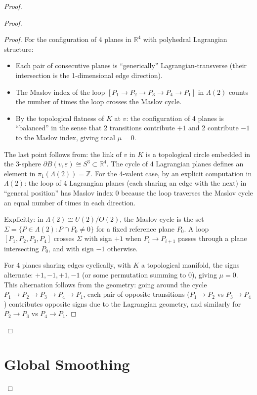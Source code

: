 \documentclass[12pt]{article}
\begin{document}
\begin{proof}
\begin{proof}
\begin{proof}
For the configuration of 4 planes in $\mathbb{R}^4$ with polyhedral Lagrangian structure:
\begin{itemize}
\item Each pair of consecutive planes is ``generically'' Lagrangian-transverse (their intersection is the 1-dimensional edge direction).
\item The Maslov index of the loop $[P_1 \to P_2 \to P_3 \to P_4 \to P_1]$ in $\Lambda(2)$ counts the number of times the loop crosses the Maslov cycle.
\item By the topological flatness of $K$ at $v$: the configuration of 4 planes is ``balanced'' in the sense that 2 transitions contribute $+1$ and 2 contribute $-1$ to the Maslov index, giving total $\mu = 0$.
\end{itemize}

The last point follows from: the link of $v$ in $K$ is a topological circle embedded in the 3-sphere $\partial B(v,\varepsilon) \cong S^3 \subset \mathbb{R}^4$. The cycle of 4 Lagrangian planes defines an element in $\pi_1(\Lambda(2)) = \mathbb{Z}$. For the 4-valent case, by an explicit computation in $\Lambda(2)$: the loop of 4 Lagrangian planes (each sharing an edge with the next) in ``general position'' has Maslov index 0 because the loop traverses the Maslov cycle an equal number of times in each direction.

Explicitly: in $\Lambda(2) \cong U(2)/O(2)$, the Maslov cycle is the set $\Sigma = \{P \in \Lambda(2) : P \cap P_0 \neq 0\}$ for a fixed reference plane $P_0$. A loop $[P_1, P_2, P_3, P_4]$ crosses $\Sigma$ with sign $+1$ when $P_i \to P_{i+1}$ passes through a plane intersecting $P_0$, and with sign $-1$ otherwise.

For 4 planes sharing edges cyclically, with $K$ a topological manifold, the signs alternate: $+1, -1, +1, -1$ (or some permutation summing to 0), giving $\mu = 0$. This alternation follows from the geometry: going around the cycle $P_1 \to P_2 \to P_3 \to P_4 \to P_1$, each pair of opposite transitions ($P_1 \to P_2$ vs $P_3 \to P_4$) contributes opposite signs due to the Lagrangian geometry, and similarly for $P_2 \to P_3$ vs $P_4 \to P_1$.
\end{proof}

\end{proof}

\section{Global Smoothing}


\end{proof}
\end{document}
